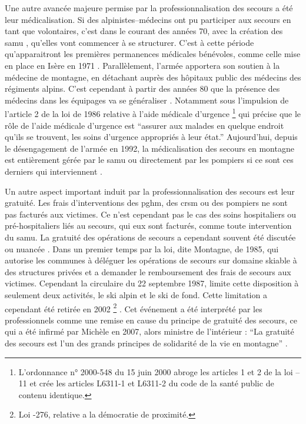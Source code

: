 Une autre avancée majeure permise par la professionnalisation des
secours a été leur médicalisation. Si des alpinistes--médecins ont pu
participer aux secours en tant que volontaires, c'est dans le courant
des années 70, avec la création des \ac{samu} \autocite{Halle2007},
qu'elles vont commencer à se structurer. C'est à cette période
qu’apparaitront les premières permanences médicales bénévoles, comme
celle mise en place en Isère en 1971
\autocite{Rocourt2014}. Parallèlement, l'armée apportera son soutien à
la médecine de montagne, en détachant auprès des hôpitaux public des
médecins des régiments alpins. C'est cependant à partir des années 80
que la présence des médecins dans les équipages va se généraliser
\autocite{CFDLD}. Notamment sous l'impulsion de l'article 2 de la loi
de 1986 relative à l'aide médicale d'urgence \footnote{L’ordonnance n°
  2000-548 du 15 juin 2000 abroge les articles 1 et 2 de la loi --11 et crée les articles L6311-1 et L6311-2 du code de la santé
  public de contenu identique.}  \autocite{Rocourt2014} qui précise
que le rôle de l'aide médicale d'urgence est
\enquote{assurer aux malades \textelp{} en quelque endroit
  qu'ils se trouvent, les soins d'urgence appropriés à leur état.}
Aujourd'hui, depuis le désengagement de l'armée en 1992, la
médicalisation des secours en montagne est entièrement gérée par le
\ac{samu} ou directement par les pompiers si ce sont ces derniers qui
interviennent \autocite{Rocourt2014, Halle2007}.

Un autre aspect important induit par la professionnalisation des
secours est leur gratuité. Les frais d'interventions des \ac{pghm},
des \ac{crsm} ou des pompiers ne sont pas facturés aux victimes. Ce
n'est cependant pas le cas des soins hospitaliers ou pré-hospitaliers
liés au secours, qui eux sont facturés, comme toute intervention du
\ac{samu}. La gratuité des opérations de secours a cependant souvent
été discutée ou nuancée \autocite{CFDLD, Halle2007, Magne2017}. Dans
un premier temps par la loi, dite Montagne, de 1985, qui autorise les
communes à déléguer les opérations de secours sur domaine skiable à
des structures privées et a demander le remboursement des frais de
secours aux victimes. Cependant la circulaire du 22 septembre 1987,
limite cette disposition à seulement deux activités, le ski alpin et
le ski de fond. Cette limitation a cependant été retirée en 2002
\footnote{Loi -276, relative a la démocratie de proximité.}
\autocite{Magne2017}. Cet événement a été interprété par les
professionnels comme une remise en cause du principe de gratuité des
secours, ce qui a été infirmé par Michèle  en 2007,
alors ministre de l'intérieur : \enquote{La gratuité des secours est
  l’un des grands principes de solidarité de la vie en montagne}
\autocite{CFDLD}.

